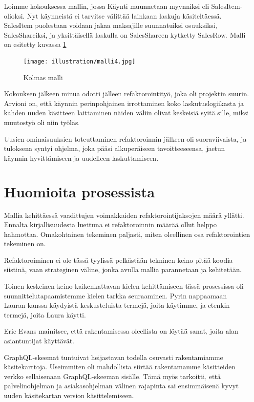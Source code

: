 Loimme kokouksessa mallin, jossa Käynti muunnetaan myynniksi eli
SalesItem-olioksi. Nyt käynneistä ei tarvitse välittää lainkaan laskuja
käsiteltäessä. SalesItem puolestaan voidaan jakaa maksajille
suunnatuiksi osuuksiksi, SalesShareiksi, ja yksittäisellä laskulla on
SalesShareen kytketty SalesRow. Malli on esitetty kuvassa \ref{malli3}

\begin{figure}
\centering
\texttt{[image: illustration/malli4.jpg]}
\caption{\label{malli3}Kolmas malli}
\end{figure}

Kokouksen jälkeen minua odotti jälleen refaktorointityö, joka oli
projektin suurin. Arvioni on, että käynnin perinpohjainen irrottaminen
koko laskutuslogiikasta ja kahden uuden käsitteen laittaminen näiden
väliin olivat keskeisiä syitä sille, miksi muutostyö oli niin työläs.

Uusien ominaisuuksien toteuttaminen refaktoroinnin jälkeen oli
suoraviivaista, ja tuloksena syntyi ohjelma, joka pääsi alkuperäiseen
tavoitteeseensa, jaetun käynnin hyvittämiseen ja uudelleen
laskuttamiseen.

\hypertarget{huomioita-prosessista}{%
\section{Huomioita prosessista}\label{huomioita-prosessista}}

Mallia kehittäessä vaadittujen voimakkaiden refaktorointijaksojen määrä
yllätti. Ennalta kirjallisuudesta luettuna ei refaktoroinnin määrää
ollut helppo hahmottaa. Omakohtainen tekeminen paljasti, miten
oleellinen osa 
refaktorointien tekeminen on.

Refaktoroiminen ei ole tässä tyylissä pelkästään tekninen keino pitää
koodia siistinä, vaan strateginen väline, jonka avulla mallia
parannetaan ja  kehitetään.

Toinen keskeinen keino kaikenkattavan kielen kehittämiseen tässä
prosessissa oli suunnittelutapaamistemme kielen tarkka seuraaminen.
Pyrin nappaamaan Lauran kanssa käydyistä keskusteluista termejä, joita
käytimme, ja etenkin termejä, joita Laura käytti.

Eric Evans mainitsee, että 
rakentamisessa oleellista on löytää sanat, joita alan asiantuntijat
käyttävät.

GraphQL-skeemat tuntuivat heijastavan todella osuvasti rakentamiamme
käsitekarttoja. Useimmiten oli mahdollista siirtää rakentamamme
käsitteiden verkko sellaisenaan GraphQL-skeeman sisälle. Tämä myös
tarkoitti, että palvelinohjelman ja asiakasohjelman välinen rajapinta
sai ensimmäisenä kyvyt uuden käsitekartan version käsittelemiseen.
